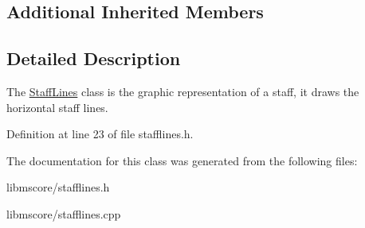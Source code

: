 \subsection*{Additional Inherited Members}


\subsection{Detailed Description}
The \hyperlink{class_ms_1_1_staff_lines}{Staff\+Lines} class is the graphic representation of a staff, it draws the horizontal staff lines. 

Definition at line 23 of file stafflines.\+h.



The documentation for this class was generated from the following files\+:\begin{DoxyCompactItemize}
\item 
libmscore/stafflines.\+h\item 
libmscore/stafflines.\+cpp\end{DoxyCompactItemize}
